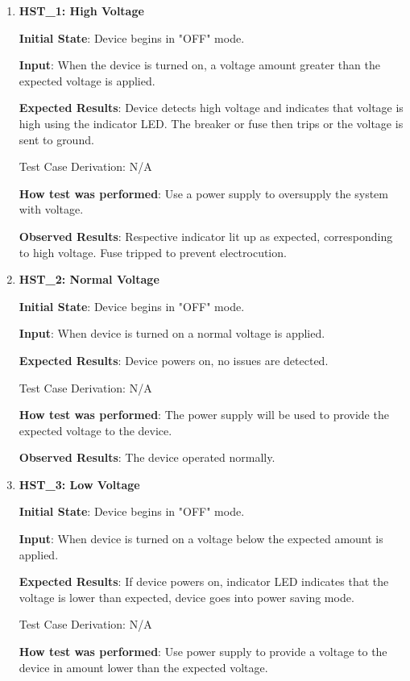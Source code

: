 \documentclass[12pt, titlepage]{article}
\begin{document}
\begin{enumerate}

  \item{\textbf{HST\_1: High Voltage}}\label{HST1}

  \textbf{Initial State}: Device begins in "OFF" mode.

  \textbf{Input}: When the device is turned on, a voltage amount greater than the expected voltage is applied.

  \textbf{Expected Results}: Device detects high voltage and indicates that voltage is high using the indicator LED. The breaker or fuse then trips or the voltage is sent to ground.

  Test Case Derivation: N/A

  \textbf{How test was performed}: Use a power supply to oversupply the system with voltage.

  \textbf{Observed Results}: Respective indicator lit up as expected, corresponding to high voltage. Fuse tripped to prevent electrocution.

  \item{\textbf{HST\_2: Normal Voltage}}\label{HST2}

  \textbf{Initial State}: Device begins in "OFF" mode.

  \textbf{Input}: When device is turned on a normal voltage is applied.

  \textbf{Expected Results}: Device powers on, no issues are detected.

  Test Case Derivation: N/A

  \textbf{How test was performed}: The power supply will be used to provide the expected voltage to the device.

  \textbf{Observed Results}: The device operated normally.

  \item{\textbf{HST\_3: Low Voltage}}\label{HST3}

  \textbf{Initial State}: Device begins in "OFF" mode.

  \textbf{Input}: When device is turned on a voltage below the expected amount is applied.

  \textbf{Expected Results}: If device powers on, indicator LED indicates that the voltage is lower than expected, device goes into power saving mode.

  Test Case Derivation: N/A

  \textbf{How test was performed}: Use power supply to provide a voltage to the device in amount lower than the expected voltage.


\end{enumerate}
\end{document}
